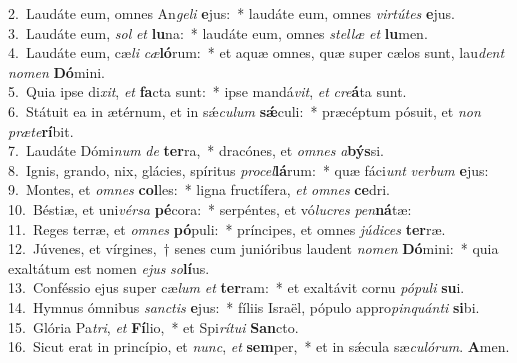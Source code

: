 {2.~}Laudáte eum, omnes An\textit{ge}\textit{li} \textbf{e}jus:~* laudáte eum, omnes \textit{vir}\textit{tú}\textit{tes} \textbf{e}jus.\\
{3.~}Laudáte eum, \textit{sol} \textit{et} \textbf{lu}na:~* laudáte eum, omnes \textit{stel}\textit{læ} \textit{et} \textbf{lu}men.\\
{4.~}Laudáte eum, cæ\textit{li} \textit{cæ}\textbf{ló}rum:~* et aquæ omnes, quæ super cælos sunt, lau\textit{dent} \textit{no}\textit{men} \textbf{Dó}mini.\\
{5.~}Quia ipse di\textit{xit}, \textit{et} \textbf{fa}cta sunt:~* ipse mandá\textit{vit}, \textit{et} \textit{cre}\textbf{á}ta sunt.\\
{6.~}Státuit ea in ætérnum, et in sǽ\textit{cu}\textit{lum} \textbf{sǽ}culi:~* præcéptum pósuit, et \textit{non} \textit{præ}\textit{te}\textbf{rí}bit.\\
{7.~}Laudáte Dómi\textit{num} \textit{de} \textbf{ter}ra,~* dracónes, et \textit{om}\textit{nes} \textit{a}\textbf{býs}si.\\
{8.~}Ignis, grando, nix, glácies, spíritus \textit{pro}\textit{cel}\textbf{lá}rum:~* quæ fáci\textit{unt} \textit{ver}\textit{bum} \textbf{e}jus:\\
{9.~}Montes, et \textit{om}\textit{nes} \textbf{col}les:~* ligna fructífera, \textit{et} \textit{om}\textit{nes} \textbf{ce}dri.\\
{10.~}Béstiæ, et uni\textit{vér}\textit{sa} \textbf{pé}cora:~* serpéntes, et vó\textit{lu}\textit{cres} \textit{pen}\textbf{ná}tæ:\\
{11.~}Reges terræ, et \textit{om}\textit{nes} \textbf{pó}puli:~* príncipes, et omnes \textit{jú}\textit{di}\textit{ces} \textbf{ter}ræ.\\
{12.~}Júvenes, et vírgines,~† senes cum junióribus laudent \textit{no}\textit{men} \textbf{Dó}mini:~* quia exaltátum est nomen \textit{e}\textit{jus} \textit{so}\textbf{lí}us.\\
{13.~}Conféssio ejus super cæ\textit{lum} \textit{et} \textbf{ter}ram:~* et exaltávit cornu \textit{pó}\textit{pu}\textit{li} \textbf{su}i.\\
{14.~}Hymnus ómnibus \textit{san}\textit{ctis} \textbf{e}jus:~* fíliis Israël, pópulo appro\textit{pin}\textit{quán}\textit{ti} \textbf{si}bi.\\
{15.~}Glória Pa\textit{tri}, \textit{et} \textbf{Fí}lio,~* et Spi\textit{rí}\textit{tu}\textit{i} \textbf{San}cto.\\
{16.~}Sicut erat in princípio, et \textit{nunc}, \textit{et} \textbf{sem}per,~* et in sǽcula sæ\textit{cu}\textit{ló}\textit{rum}. \textbf{A}men.\\
